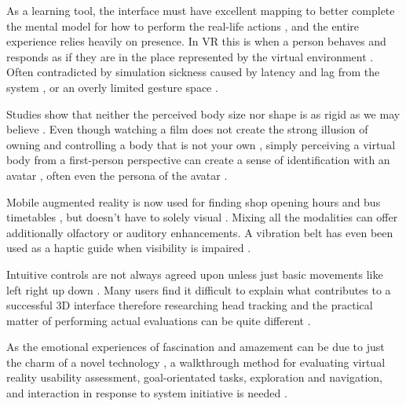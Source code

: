 \documentclass{scrartcl}
\begin{document}
As a learning tool, the interface must have excellent mapping to better complete the mental model for how to perform the real-life actions \cite{skalski2011mapping}, and the entire experience relies heavily on presence. In VR this is when a person behaves and responds as if they are in the place represented by the virtual environment \cite{bianchi2013understanding}. Often contradicted by simulation sickness caused by latency and lag from the system \cite{biocca1997cyborg} \cite{steinicke2014self}, or an overly limited gesture space \cite{walter2000incremental}. 

Studies show that neither the perceived body size nor shape is as rigid as we may believe \cite{kilteni2012extending}. Even though watching a film does not create the strong illusion of owning and controlling a body that is not your own \cite{madary2016real}, simply perceiving a virtual body from a first-person perspective can create a sense of identification with an avatar \cite{won2015homuncular}, often even the persona of the avatar \cite{yoon2014know}. 

Mobile augmented reality \cite{de2012mobile} is now used for finding shop opening hours and bus timetables \cite{venta2012user}, but doesn't have to solely visual \cite{kalawsky2000taxonomy}. Mixing all the modalities \cite{lindeman2007classification} can offer additionally olfactory or auditory enhancements. A vibration belt has even been used as a haptic guide when visibility is impaired \cite{van2005waypoint}.

Intuitive controls are not always agreed upon \cite{nielsen2003procedure} unless just basic movements like left right up down \cite{oskoei2009application}. Many users find it difficult to explain what contributes to a successful 3D interface \cite{john1998traditional} therefore researching head tracking \cite{azuma1993tracking} and the practical matter of performing actual evaluations can be quite different \cite{bowman2002survey}.

As the emotional experiences of fascination and amazement can be due to just the charm of a novel technology \cite{olsson2012narratives}, a walkthrough method for evaluating virtual reality usability assessment, goal-orientated tasks, exploration and navigation, and interaction in response to system initiative is needed \cite{sutcliffe2000evaluating}.




\end{document}
